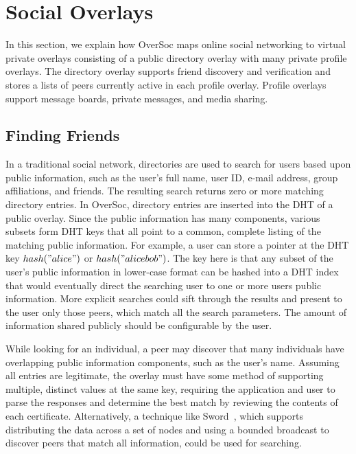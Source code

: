 \documentclass{sig-alternate}
\begin{document}
\section{Social Overlays}
\label{social_overlays}

In this section, we explain how OverSoc maps online social networking to
virtual private overlays consisting of a public directory overlay with many
private profile overlays.  The directory overlay supports friend discovery and
verification and stores a lists of peers currently active in each profile
overlay.  Profile overlays support message boards, private messages, and media
sharing.

\subsection{Finding Friends}

In a traditional social network, directories are used to search for users based
upon public information, such as the user's full name, user ID, e-mail address,
group affiliations, and friends.  The resulting search returns zero or more
matching directory entries.  In OverSoc, directory entries are inserted into
the DHT of a public overlay.  Since the public information has many components,
various subsets form DHT keys that all point to a common, complete listing of
the matching public information.  For example, a user can store a pointer at
the DHT key $hash("alice")$ or $hash("alice bob")$.  The key here is that any
subset of the user's public information in lower-case format can be hashed into
a DHT index that would eventually direct the searching user to one or more
users public information.  More explicit searches could sift through the
results and present to the user only those peers, which match all the search
parameters.  The amount of information shared publicly should be configurable
by the user.

While looking for an individual, a peer may discover that many individuals have
overlapping public information components, such as the user's name.  Assuming
all entries are legitimate, the overlay must have some method of supporting
multiple, distinct values at the same key, requiring the application and user
to parse the responses and determine the best match by reviewing the contents
of each certificate.  Alternatively, a technique like Sword~\cite{sword}, which
supports distributing the data across a set of nodes and using a bounded
broadcast to discover peers that match all information, could be used for
searching.
\end{document}
